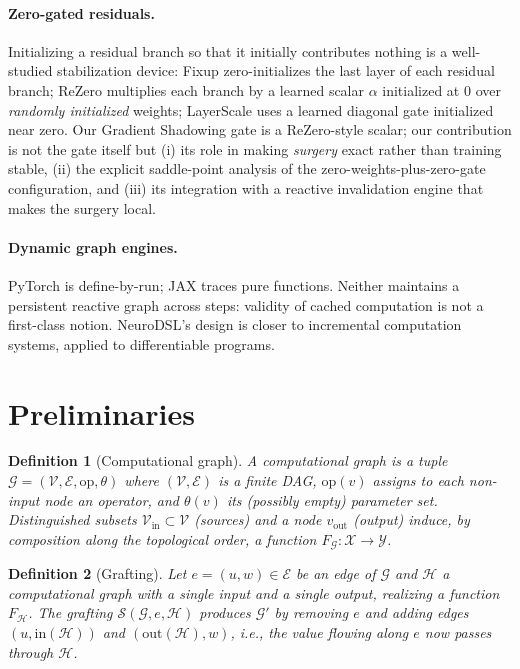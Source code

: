 \documentclass[11pt,a4paper]{article}
\newtheorem{definition}{Definition}
\newcommand{\G}{\mathcal{G}}
\newcommand{\Gp}{\mathcal{G}'}
\newcommand{\Hb}{\mathcal{H}}
\newcommand{\V}{\mathcal{V}}
\newcommand{\E}{\mathcal{E}}
\newcommand{\Surg}{\mathcal{S}}
\begin{document}
\paragraph{Zero-gated residuals.} Initializing a residual branch so that it initially contributes nothing is a well-studied stabilization device: Fixup \cite{fixup} zero-initializes the last layer of each residual branch; ReZero \cite{rezero} multiplies each branch by a learned scalar $\alpha$ initialized at $0$ over \emph{randomly initialized} weights; LayerScale \cite{layerscale} uses a learned diagonal gate initialized near zero. Our Gradient Shadowing gate is a ReZero-style scalar; our contribution is not the gate itself but (i) its role in making \emph{surgery} exact rather than training stable, (ii) the explicit saddle-point analysis of the zero-weights-plus-zero-gate configuration, and (iii) its integration with a reactive invalidation engine that makes the surgery local.

\paragraph{Dynamic graph engines.} PyTorch \cite{pytorch} is define-by-run; JAX \cite{jax} traces pure functions. Neither maintains a persistent reactive graph across steps: validity of cached computation is not a first-class notion. NeuroDSL's design is closer to incremental computation systems, applied to differentiable programs.

\section{Preliminaries}
\label{sec:prelim}

\begin{definition}[Computational graph]
A computational graph is a tuple $\G = (\V, \E, \mathrm{op}, \theta)$ where $(\V, \E)$ is a finite DAG, $\mathrm{op}(v)$ assigns to each non-input node an operator, and $\theta(v)$ its (possibly empty) parameter set. Distinguished subsets $\V_{\mathrm{in}} \subset \V$ (sources) and a node $v_{\mathrm{out}}$ (output) induce, by composition along the topological order, a function $F_{\G} : \mathcal{X} \to \mathcal{Y}$.
\end{definition}

\begin{definition}[Grafting]
Let $e = (u, w) \in \E$ be an edge of $\G$ and $\Hb$ a computational graph with a single input and a single output, realizing a function $F_{\Hb}$. The grafting $\Surg(\G, e, \Hb)$ produces $\Gp$ by removing $e$ and adding edges $(u, \mathrm{in}(\Hb))$ and $(\mathrm{out}(\Hb), w)$, i.e., the value flowing along $e$ now passes through $\Hb$.
\end{definition}
\end{document}
